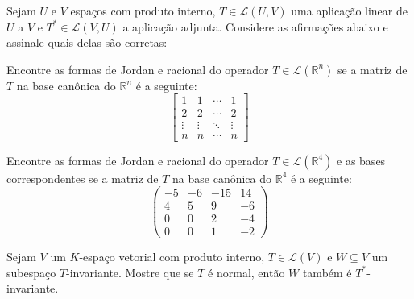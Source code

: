 \documentclass[11pt,a4paper]{article}
\begin{document}
\begin{exercicio}
Sejam $U$ e $V$ espaços com produto interno, $T \in \mathcal{L}(U,V)$ uma aplicação linear de $U$ a $V$ e $T^{*} \in \mathcal{L}(V,U)$ a aplicação adjunta. Considere as afirmações abaixo e assinale quais delas são corretas:
\end{exercicio}
\solucao{}
\begin{exercicio}
Encontre as formas de Jordan e racional do operador $T \in \mathcal{L}(\mathbb{R}^n)$ se a matriz de $T$ na base canônica do $\mathbb{R}^n$ é a seguinte:
\[
\begin{bmatrix}
1 & 1 & \cdots & 1 \\
2 & 2 & \cdots & 2 \\
\vdots & \vdots & \ddots & \vdots \\
n & n & \cdots & n
\end{bmatrix}
\]
\end{exercicio}
\solucao{
}
\begin{exercicio}
Encontre as formas de Jordan e racional do operador $T \in \mathcal{L}(\mathbb{R}^4)$ e as bases correspondentes se a matriz de $T$ na base canônica do $\mathbb{R}^4$ é a seguinte:
\[
\begin{pmatrix}
-5 & -6 & -15 & 14 \\
4 & 5 & 9 & -6 \\
0 & 0 & 2 & -4 \\
0 & 0 & 1 & -2
\end{pmatrix}
\]
\end{exercicio}
\solucao{}
\begin{exercicio}
Sejam $V$ um $K$-espaço vetorial com produto interno, $T \in \mathcal{L}(V)$ e $W \subseteq V$ um subespaço $T$-invariante. Mostre que se $T$ é normal, então $W$ também é $T^{*}$-invariante.
\end{exercicio}
\solucao{}
 
\end{document}
